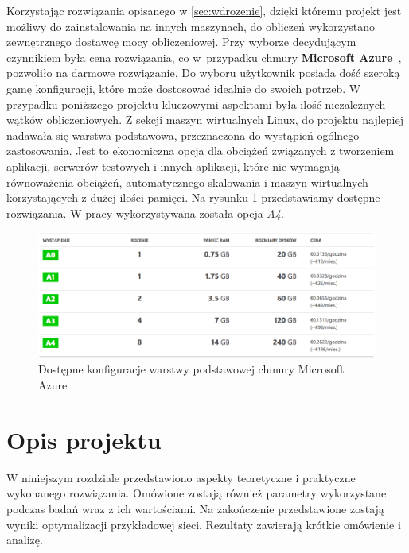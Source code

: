 \documentclass[twoside,12pt]{report}
\let\oldsection\chapter
\def\chapter{\cleardoublepage\oldsection}
\begin{document}
Korzystając rozwiązania opisanego w \ref{sec:wdrozenie}, dzięki któremu projekt jest możliwy do zainstalowania na innych maszynach, do obliczeń wykorzystano zewnętrznego dostawcę mocy obliczeniowej. Przy wyborze decydującym czynnikiem była cena rozwiązania, co w~przypadku chmury\textbf{ Microsoft Azure}~\cite{azure}, pozwoliło na darmowe rozwiązanie. Do wyboru użytkownik posiada dość szeroką gamę konfiguracji, które może dostosować idealnie do swoich potrzeb. W przypadku poniższego projektu kluczowymi aspektami była ilość niezależnych wątków obliczeniowych. Z sekcji maszyn wirtualnych Linux, do projektu najlepiej nadawała się warstwa podstawowa, przeznaczona do wystąpień ogólnego zastosowania. Jest to ekonomiczna opcja dla obciążeń związanych z tworzeniem aplikacji, serwerów testowych i innych aplikacji, które nie wymagają równoważenia obciążeń, automatycznego skalowania i maszyn wirtualnych korzystających z dużej ilości pamięci. Na rysunku \ref{fig:azure_dostepne_opcje} przedstawiamy dostępne rozwiązania. W pracy wykorzystywana została opcja \textit{A4}.

\begin{figure}[htbp]
	\centering
	\includegraphics[width=\textwidth]{img/azure_opcje}
	\caption{Dostępne konfiguracje warstwy podstawowej chmury Microsoft Azure}
	\label{fig:azure_dostepne_opcje}
\end{figure}


\chapter{Opis projektu}\label{rozdz.opis} 

W niniejszym rozdziale przedstawiono aspekty teoretyczne i praktyczne wykonanego rozwiązania. Omówione zostają również parametry wykorzystane podczas badań wraz z ich wartościami. Na zakończenie przedstawione zostają wyniki optymalizacji przykładowej sieci. Rezultaty zawierają krótkie omówienie i analizę.
\end{document}
